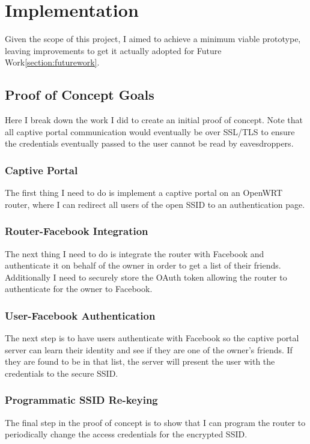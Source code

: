 \section{Implementation}
\label{section:implementation}
Given the scope of this project, I aimed to achieve a minimum viable prototype, leaving improvements
to get it actually adopted for Future Work\ref{section:futurework}.

\subsection{Proof of Concept Goals}
Here I break down the work I did to create an initial proof of concept. Note that all captive portal
communication would eventually be over SSL/TLS to ensure the credentials eventually passed to the
user cannot be read by eavesdroppers.

\subsubsection{Captive Portal}
The first thing I need to do is implement a captive portal on an OpenWRT router, where I can
redirect all users of the open SSID to an authentication page.

\subsubsection{Router-Facebook Integration}
The next thing I need to do is integrate the router with Facebook and authenticate it on behalf of
the owner in order to get a list of their friends. Additionally I need to securely store the OAuth
token allowing the router to authenticate for the owner to Facebook.

\subsubsection{User-Facebook Authentication}
The next step is to have users authenticate with Facebook so the captive portal server can learn
their identity and see if they are one of the owner's friends. If they are found to be in that list,
the server will present the user with the credentials to the secure SSID.

\subsubsection{Programmatic SSID Re-keying}
The final step in the proof of concept is to show that I can program the router to periodically
change the access credentials for the encrypted SSID.

